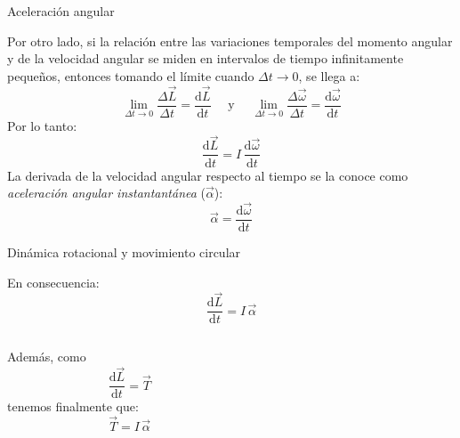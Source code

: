 \documentclass[11pt,handout,aspectratio=1610]{beamer}
\newcommand{\fdiff}[2]{\dfrac{\text{d} #1}{\text{d} #2}}
\begin{document}
\begin{frame}{Aceleración angular}

    Por otro lado, si la relación entre las variaciones temporales del momento angular y de la velocidad angular se miden en intervalos de tiempo infinitamente pequeños, entonces tomando el límite cuando $\Delta t \to 0$, se llega a: $$ \lim_{\Delta t \to 0} \frac{\Delta \vec{L}}{\Delta t} = \fdiff{\vec{L}}{t} \quad \text{ y } \quad \lim_{\Delta t \to 0} \frac{\Delta \vec{\omega}}{\Delta t} = \fdiff{\vec{\omega}}{t} $$ Por lo tanto: $$ \fdiff{\vec{L}}{t} = I \, \fdiff{\vec{\omega}}{t}$$ La derivada de la velocidad angular respecto al tiempo se la conoce como \emph{aceleración angular instantantánea} ($\vec{\alpha}$): $$ \vec{\alpha} = \fdiff{\vec{\omega}}{t}$$

\end{frame}

\begin{frame}{Dinámica rotacional y movimiento circular}

    En consecuencia: $$\fdiff{\vec{L}}{t} = I \, \vec{\alpha}$$

    \begin{columns}
        \begin{column}{0.4\textwidth}
            Además, como $$\fdiff{\vec{L}}{t} = \vec{T}$$ tenemos finalmente que: $$\vec{T} = I \, \vec{\alpha}$$
        \end{column}
        \begin{column}{0.6\textwidth}
            \begin{figure}[h]
                \centering
            \end{figure}
        \end{column}
    \end{columns}
    
\end{frame}
\end{document}
